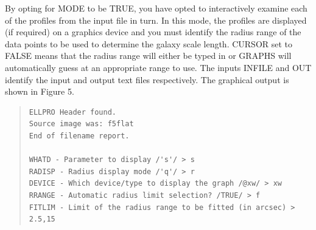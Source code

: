 \documentclass[twoside,11pt]{article}
\newenvironment{myquote}{\begin{quote}\begin{small}}{\end{small}\end{quote}}
\begin{document}
By opting for MODE to be TRUE, you have opted to interactively examine 
each of the profiles from the input file in turn. In this mode, the profiles are
displayed (if required) on a graphics device and you must
identify the radius range of the data points to be used to determine the
galaxy scale length. CURSOR set to FALSE means that the radius range will
either be typed in or GRAPHS will automatically guess at an
appropriate range to use. The inputs INFILE and OUT identify the input and 
output text files respectively. The graphical output is shown in 
Figure 5.
 
\begin{myquote}
\begin{verbatim}
ELLPRO Header found.
Source image was: f5flat
End of filename report.
 
WHATD - Parameter to display /'s'/ > s
RADISP - Radius display mode /'q'/ > r
DEVICE - Which device/type to display the graph /@xw/ > xw
RRANGE - Automatic radius limit selection? /TRUE/ > f
FITLIM - Limit of the radius range to be fitted (in arcsec) > 2.5,15 
\end{verbatim}
\end{myquote}
\end{document}
